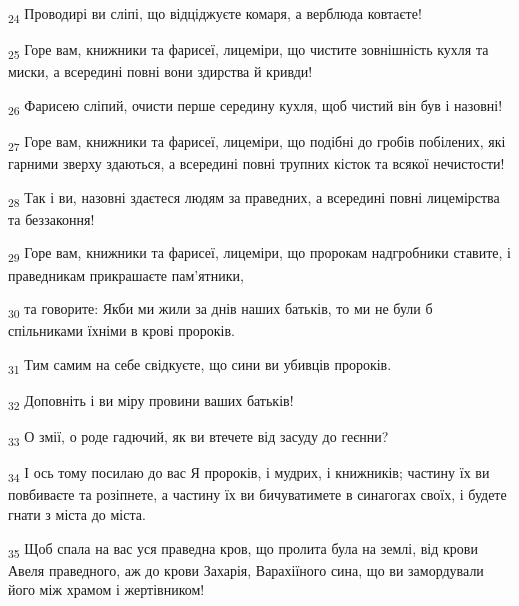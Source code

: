 \begin{tcolorbox}
\textsubscript{24} Проводирі ви сліпі, що відціджуєте комаря, а верблюда ковтаєте!
\end{tcolorbox}
\begin{tcolorbox}
\textsubscript{25} Горе вам, книжники та фарисеї, лицеміри, що чистите зовнішність кухля та миски, а всередині повні вони здирства й кривди!
\end{tcolorbox}
\begin{tcolorbox}
\textsubscript{26} Фарисею сліпий, очисти перше середину кухля, щоб чистий він був і назовні!
\end{tcolorbox}
\begin{tcolorbox}
\textsubscript{27} Горе вам, книжники та фарисеї, лицеміри, що подібні до гробів побілених, які гарними зверху здаються, а всередині повні трупних кісток та всякої нечистости!
\end{tcolorbox}
\begin{tcolorbox}
\textsubscript{28} Так і ви, назовні здаєтеся людям за праведних, а всередині повні лицемірства та беззаконня!
\end{tcolorbox}
\begin{tcolorbox}
\textsubscript{29} Горе вам, книжники та фарисеї, лицеміри, що пророкам надгробники ставите, і праведникам прикрашаєте пам'ятники,
\end{tcolorbox}
\begin{tcolorbox}
\textsubscript{30} та говорите: Якби ми жили за днів наших батьків, то ми не були б спільниками їхніми в крові пророків.
\end{tcolorbox}
\begin{tcolorbox}
\textsubscript{31} Тим самим на себе свідкуєте, що сини ви убивців пророків.
\end{tcolorbox}
\begin{tcolorbox}
\textsubscript{32} Доповніть і ви міру провини ваших батьків!
\end{tcolorbox}
\begin{tcolorbox}
\textsubscript{33} О змії, о роде гадючий, як ви втечете від засуду до геєнни?
\end{tcolorbox}
\begin{tcolorbox}
\textsubscript{34} І ось тому посилаю до вас Я пророків, і мудрих, і книжників; частину їх ви повбиваєте та розіпнете, а частину їх ви бичуватимете в синагогах своїх, і будете гнати з міста до міста.
\end{tcolorbox}
\begin{tcolorbox}
\textsubscript{35} Щоб спала на вас уся праведна кров, що пролита була на землі, від крови Авеля праведного, аж до крови Захарія, Варахіїного сина, що ви замордували його між храмом і жертівником!
\end{tcolorbox}
